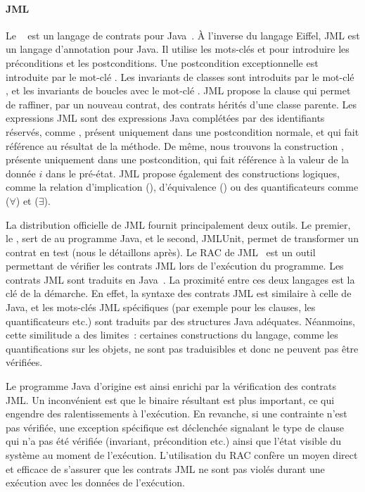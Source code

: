 \paragraph{JML} Le ~ est un langage
de contrats pour Java~. À l'inverse du langage Eiffel, JML est un
langage d'annotation pour Java. Il utilise les mots-clés  et
 pour introduire les préconditions et les postconditions. Une
postcondition exceptionnelle est introduite par le mot-clé . Les
invariants de classes sont introduits par le mot-clé , et les
invariants de boucles avec le mot-clé . JML propose la
clause  qui permet de raffiner, par un nouveau contrat, des contrats
hérités d'une classe parente. Les expressions JML sont des expressions Java
complétées par des identifiants réservés, comme \aresult, présent uniquement
dans une postcondition normale, et qui fait référence au résultat de la méthode.
De même, nous trouvons la construction , présente uniquement dans une
postcondition, qui fait référence à la valeur de la donnée $i$ dans le pré-état.
JML propose également des constructions logiques, comme la relation
d'implication (\code{==>}), d'équivalence (\code{<==>}) ou des quantificateurs
comme  ($\forall$) et  ($\exists$).

La distribution officielle de JML fournit principalement deux outils.  Le
premier, le , sert de
 au programme Java, et le second, JMLUnit, permet de
transformer un contrat en test (nous le détaillons après). Le RAC de
JML~ est un outil permettant de vérifier les contrats JML lors de
l'exécution du programme. Les contrats JML sont traduits en
Java~. La proximité entre ces deux langages est la clé de la
démarche. En effet, la syntaxe des contrats JML est similaire à celle de Java,
et les mots-clés JML spécifiques (par exemple pour les clauses, les
quantificateurs etc.) sont traduits par des structures Java adéquates.
Néanmoins, cette similitude a des limites~: certaines constructions du langage,
comme les quantifications sur les objets, ne sont pas traduisibles et donc ne
peuvent pas être vérifiées.

Le programme Java d'origine est ainsi enrichi par la vérification des contrats
JML. Un inconvénient est que le binaire résultant est plus important, ce qui
engendre des ralentissements à l'exécution. En revanche, si une contrainte n'est
pas vérifiée, une exception spécifique est déclenchée signalant le type de
clause qui n'a pas été vérifiée (invariant, précondition etc.) ainsi que l'état
visible du système au moment de l'exécution. L'utilisation du RAC confère un
moyen direct et efficace de s'assurer que les contrats JML ne sont pas violés
durant une exécution avec les données de l'exécution.

